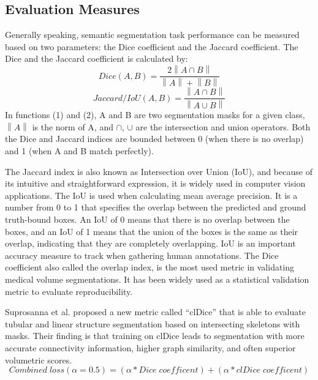 \documentclass{article}
\begin{document}
\subsection{Evaluation Measures}
Generally speaking, semantic segmentation task performance can be measured based on two parameters: the Dice coefficient and the Jaccard coefficient. The Dice and the Jaccard coefficient is calculated by:
\begin{equation}
    Dice(A,B) = \frac{2\left \| A \cap B \right \|}{\left \| A \right \|+\left \| B \right \|}
\end{equation}
\begin{equation}
    Jaccard/IoU(A,B) = \frac{\left \| A \cap B \right \|}{\left \| A\cup B \right \|}
\end{equation}
In functions (1) and (2), A and B are two segmentation masks for a given class, $\left \| A \right \|$ is the norm of A, and $\cap$, $\cup$ are the intersection and union operators. Both the Dice and Jaccard indices are bounded between 0 (when there is no overlap) and 1 (when A and B match perfectly).

The Jaccard index is also known as Intersection over Union (IoU), and because of its intuitive and straightforward expression, it is widely used in computer vision applications. The IoU is used when calculating mean average precision. It is a number from 0 to 1 that specifies the overlap between the predicted and ground truth-bound boxes. An IoU of 0 means that there is no overlap between the boxes, and an IoU of 1 means that the union of the boxes is the same as their overlap, indicating that they are completely overlapping. IoU is an important accuracy measure to track when gathering human annotations. The Dice coefficient also called the overlap index, is the most used metric in validating medical volume segmentations. It has been widely used as a statistical validation metric to evaluate reproducibility.

Suprosanna et al.\cite{shit2020cldice} proposed a new metric called “clDice” that is able to evaluate tubular and linear structure segmentation based on intersecting skeletons with masks. Their finding is that training on clDice leads to segmentation with more accurate connectivity information, higher graph similarity, and often superior volumetric scores.
\begin{equation}
    Combined\;loss(\alpha=0.5) = (\alpha * Dice\;coefficent)+(\alpha * clDice\;coefficent)
\end{equation}
\end{document}
